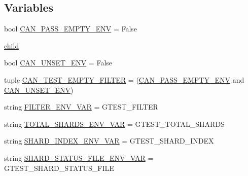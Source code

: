 \subsection*{Variables}
\begin{DoxyCompactItemize}
\item 
bool \mbox{\hyperlink{namespacegoogletest_1_1test_1_1googletest-filter-unittest_a42f52a10957138e1999d94faa5721690}{C\+A\+N\+\_\+\+P\+A\+S\+S\+\_\+\+E\+M\+P\+T\+Y\+\_\+\+E\+NV}} = False
\item 
\mbox{\hyperlink{namespacegoogletest_1_1test_1_1googletest-filter-unittest_a78be278fabf3311afb39ebef6b605ff8}{child}}
\item 
bool \mbox{\hyperlink{namespacegoogletest_1_1test_1_1googletest-filter-unittest_ae6b627c7f8c03f36686e1fc1831301c0}{C\+A\+N\+\_\+\+U\+N\+S\+E\+T\+\_\+\+E\+NV}} = False
\item 
tuple \mbox{\hyperlink{namespacegoogletest_1_1test_1_1googletest-filter-unittest_abb728ff787755c0a5023eb92188b0da7}{C\+A\+N\+\_\+\+T\+E\+S\+T\+\_\+\+E\+M\+P\+T\+Y\+\_\+\+F\+I\+L\+T\+ER}} = (\mbox{\hyperlink{namespacegoogletest_1_1test_1_1googletest-filter-unittest_a42f52a10957138e1999d94faa5721690}{C\+A\+N\+\_\+\+P\+A\+S\+S\+\_\+\+E\+M\+P\+T\+Y\+\_\+\+E\+NV}} and \mbox{\hyperlink{namespacegoogletest_1_1test_1_1googletest-filter-unittest_ae6b627c7f8c03f36686e1fc1831301c0}{C\+A\+N\+\_\+\+U\+N\+S\+E\+T\+\_\+\+E\+NV}})
\item 
string \mbox{\hyperlink{namespacegoogletest_1_1test_1_1googletest-filter-unittest_a916c8879cb8f57caceca3ebd44281d18}{F\+I\+L\+T\+E\+R\+\_\+\+E\+N\+V\+\_\+\+V\+AR}} = \textquotesingle{}G\+T\+E\+S\+T\+\_\+\+F\+I\+L\+T\+ER\textquotesingle{}
\item 
string \mbox{\hyperlink{namespacegoogletest_1_1test_1_1googletest-filter-unittest_a31925a728f291c2c5ad10dba74a9089b}{T\+O\+T\+A\+L\+\_\+\+S\+H\+A\+R\+D\+S\+\_\+\+E\+N\+V\+\_\+\+V\+AR}} = \textquotesingle{}G\+T\+E\+S\+T\+\_\+\+T\+O\+T\+A\+L\+\_\+\+S\+H\+A\+R\+DS\textquotesingle{}
\item 
string \mbox{\hyperlink{namespacegoogletest_1_1test_1_1googletest-filter-unittest_a9bd8152eb318316b4aa67cb40a5d8063}{S\+H\+A\+R\+D\+\_\+\+I\+N\+D\+E\+X\+\_\+\+E\+N\+V\+\_\+\+V\+AR}} = \textquotesingle{}G\+T\+E\+S\+T\+\_\+\+S\+H\+A\+R\+D\+\_\+\+I\+N\+D\+EX\textquotesingle{}
\item 
string \mbox{\hyperlink{namespacegoogletest_1_1test_1_1googletest-filter-unittest_aba5602c2a676e9de5a4cdde3024e92c0}{S\+H\+A\+R\+D\+\_\+\+S\+T\+A\+T\+U\+S\+\_\+\+F\+I\+L\+E\+\_\+\+E\+N\+V\+\_\+\+V\+AR}} = \textquotesingle{}G\+T\+E\+S\+T\+\_\+\+S\+H\+A\+R\+D\+\_\+\+S\+T\+A\+T\+U\+S\+\_\+\+F\+I\+LE\textquotesingle{}

\end{DoxyCompactItemize}
